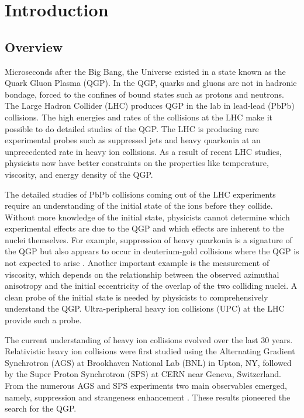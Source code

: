 \chapter{Introduction}
  \section{Overview}
  Microseconds after the Big Bang, the Universe existed in a state known as
    the Quark Gluon Plasma (QGP).
  In the QGP, quarks and gluons are not in hadronic bondage, forced to 
    the confines of bound states such as protons and neutrons.
  The Large Hadron Collider (LHC) produces QGP in the lab in lead-lead (PbPb)
    collisions.
  The high energies and rates of the collisions at the LHC make it possible 
    to do detailed studies of the QGP. 
  The LHC is producing rare experimental probes such as suppressed jets and 
    heavy quarkonia at an unprecedented rate in heavy ion collisions. 
  As a result of recent LHC studies, physicists now have better constraints on 
    the properties like temperature, viscosity, and energy density of the QGP.

  The detailed studies of PbPb collisions coming out of the LHC 
    experiments require an understanding of the initial state of the ions 
    before they collide.
  Without more knowledge of the initial state, physicists cannot determine 
    which experimental effects are due to the QGP and which effects are 
    inherent to the nuclei themselves. 
  For example, suppression of heavy quarkonia is a signature of the QGP 
    but also appears to occur in deuterium-gold collisions where the QGP is not
    expected to arise \cite{dAuOniaPHENIX}. 
  Another important example is the measurement of viscosity, which depends on 
    the relationship between the observed azimuthal anisotropy and the 
    initial eccentricity of the overlap of the two colliding nuclei. 
  A clean probe of the initial state is needed by physicists to comprehensively 
    understand the QGP.
  Ultra-peripheral heavy ion collisions (UPC) at the LHC provide such a probe.

  The current understanding of heavy ion collisions evolved over the
    last 30 years.
  Relativistic heavy ion collisions were first studied using the 
    Alternating Gradient Synchrotron (AGS) at Brookhaven National Lab (BNL) 
    in Upton, NY, followed by the Super Proton Synchrotron (SPS) at CERN near 
    Geneva, Switzerland. 
  From the numerous AGS and SPS experiments two main observables emerged,
    namely, \JPsi{} suppression and strangeness enhancement \cite{sps}. 
  These results pioneered the search for the QGP. 

